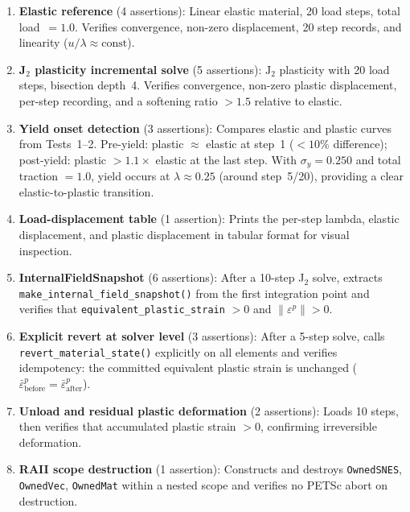\begin{enumerate}
  \item \textbf{Elastic reference} (4 assertions):
        Linear elastic material, 20 load steps, total load~$= 1.0$.
        Verifies convergence, non-zero displacement, 20 step records,
        and linearity ($u/\lambda \approx \text{const}$).

  \item \textbf{J$_2$ plasticity incremental solve} (5 assertions):
        $\text{J}_2$ plasticity with 20 load steps, bisection depth~4.
        Verifies convergence, non-zero plastic displacement, per-step
        recording, and a softening ratio $> 1.5$ relative to elastic.

  \item \textbf{Yield onset detection} (3 assertions):
        Compares elastic and plastic curves from Tests~1--2.
        Pre-yield: plastic $\approx$ elastic at step~1
        ($< 10\%$ difference);
        post-yield: plastic $> 1.1\times$ elastic at the last step.
        With $\sigma_y = 0.250$ and total traction $= 1.0$, yield
        occurs at $\lambda \approx 0.25$ (around step~5/20), providing
        a clear elastic-to-plastic transition.

  \item \textbf{Load-displacement table} (1 assertion):
        Prints the per-step lambda, elastic displacement, and plastic
        displacement in tabular format for visual inspection.

  \item \textbf{InternalFieldSnapshot} (6 assertions):
        After a 10-step J$_2$ solve, extracts
        \texttt{make\_internal\_field\_snapshot()} from the first
        integration point and verifies that
        \texttt{equivalent\_plastic\_strain} $> 0$ and
        $\|\varepsilon^p\| > 0$.

  \item \textbf{Explicit revert at solver level} (3 assertions):
        After a 5-step solve, calls
        \texttt{revert\_material\_state()} explicitly on all elements
        and verifies idempotency: the committed equivalent plastic
        strain is unchanged ($\bar\varepsilon^p_\text{before} =
        \bar\varepsilon^p_\text{after}$).

  \item \textbf{Unload and residual plastic deformation} (2 assertions):
        Loads 10 steps, then verifies that accumulated plastic strain
        $> 0$, confirming irreversible deformation.

  \item \textbf{RAII scope destruction} (1 assertion):
        Constructs and destroys \texttt{OwnedSNES}, \texttt{OwnedVec},
        \texttt{OwnedMat} within a nested scope and verifies no PETSc
        abort on destruction.
\end{enumerate}


